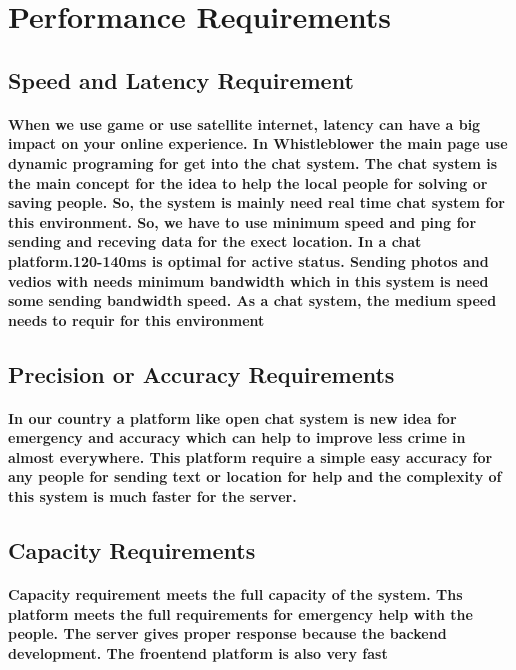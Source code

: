 \documentclass{article}
\begin{document}
\section{Performance Requirements}
\subsection{Speed and Latency Requirement}

\paragraph{When we use game or use satellite internet, latency can have a big impact on your online experience. In Whistleblower the main page use dynamic programing for get into the chat system. The chat system is the main concept for the idea to help the local people for solving or saving people. So, the system is mainly need real time chat system for this environment. So, we have to use minimum speed and ping for sending and receving data for the exect location. In a
chat platform.120-140ms is optimal for active status. Sending photos and vedios with needs minimum bandwidth which in this system is need some sending bandwidth speed. As a chat system, the medium speed needs to requir for this environment}

\newpage
\subsection{Precision or Accuracy Requirements }
\paragraph{In our country a platform like open chat system is new idea for emergency and accuracy which can help to improve less crime in almost everywhere. This platform require a 
simple easy accuracy for any people for sending text or location for help and the complexity of this system is much faster for the server.}
\subsection{Capacity Requirements}
\paragraph{Capacity requirement meets the full capacity of the system. Ths platform meets the full requirements for emergency help with the people. 
The server gives proper response because  the backend development. The froentend platform is also very fast }
\end{document}
